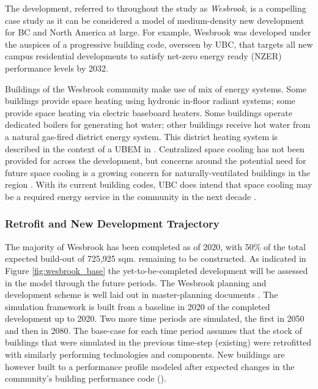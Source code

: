 \documentclass[twocolumn, a4paper,10pt]{article}
\begin{document}
 The development, referred to throughout the study as \textit{Wesbrook}, is a compelling case study as it can be considered a model of medium-density new development for BC and North America at large. For example, Wesbrook was developed under the auspices of a progressive building code, overseen by UBC, that targets all new campus residential developments to satisfy net-zero energy ready (NZER) performance levels by 2032.

 Buildings of the Wesbrook community make use of mix of energy systems. Some buildings provide space heating using hydronic in-floor radiant systems; some provide space heating via electric baseboard heaters. Some buildings operate dedicated boilers for generating hot water; other buildings receive hot water from a natural gas-fired district energy system.  This district heating system is described in the context of a UBEM in \citet{mccarty_accepted_2020}. Centralized space cooling has not been provided for across the development, but concerns around the potential need for future space cooling is a growing concern for naturally-ventilated buildings in the region \citep{rysanek_forecasting_2021}. With its current building codes, UBC does intend that space cooling may be a required energy service in the community in the next decade \citep{noauthor_residential_2021}.

\subsubsection*{Retrofit and New Development Trajectory}
The majority of Wesbrook has been completed as of 2020, with 50\% of the total expected build-out of 725,925 sqm. remaining to be constructed. As indicated in Figure \ref{fig:wesbrook_base} the yet-to-be-completed development will be assessed in the model through the future periods. The Wesbrook planning and development scheme is well laid out in master-planning documents \citep{ubc_planning_ubc_2020_wb}. The simulation framework is built from a baseline in 2020 of the completed development up to 2020. Two more time periods are simulated, the first in 2050 and then in 2080. The base-case for each time period assumes that the stock of buildings that were simulated in the previous time-step (existing) were retrofitted with similarly performing technologies and components. New buildings are however built to a performance profile modeled after expected changes in the community's building performance code (\citep{noauthor_residential_2021}). 
\end{document}
